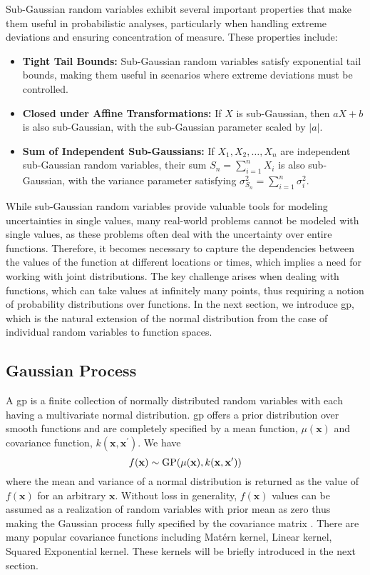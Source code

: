 Sub-Gaussian random variables exhibit several important properties that make them useful in probabilistic analyses, particularly when handling extreme deviations and ensuring concentration of measure. These properties include:  
\begin{itemize}
    \item \textbf{Tight Tail Bounds:} Sub-Gaussian random variables satisfy exponential tail bounds, making them useful in scenarios where extreme deviations must be controlled.  
    \item \textbf{Closed under Affine Transformations:} If \( X \) is sub-Gaussian, then \( aX + b \) is also sub-Gaussian, with the sub-Gaussian parameter scaled by \( \vert a \vert \).  
    \item \textbf{Sum of Independent Sub-Gaussians:} If \( X_1, X_2, \dots, X_n \) are independent sub-Gaussian random variables, their sum \( S_n = \sum_{i=1}^n X_i \) is also sub-Gaussian, with the variance parameter satisfying \( \sigma^2_{S_n} = \sum_{i=1}^n \sigma_i^2 \).  
\end{itemize} 

While sub-Gaussian random variables provide valuable tools for modeling uncertainties in single values, many real-world problems cannot be modeled with single values, as these problems often deal with the uncertainty over entire functions. Therefore, it becomes necessary to capture the dependencies between the values of the function at different locations or times, which implies a need for working with joint distributions. The key challenge arises when dealing with functions, which can take values at infinitely many points, thus requiring a notion of probability distributions over functions. In the next section,  we introduce \acf{gp}, which is the natural extension of the normal distribution from the case of individual random variables to function spaces.

\subsection{Gaussian Process}
\label{section:gaussian_process}
A \acf{gp} is a finite collection of normally distributed random variables with each having a multivariate normal distribution. \ac{gp} offers a prior distribution over smooth functions and are completely specified by a mean function, $\mu(\mathbf{x})$ and covariance function, $k(\mathbf{x}, \mathbf{x}^\prime)$. We have \begin{equation}
    \label{def:GP}
    f({\bf x})\sim\mathrm{GP}(\mu({\bf x}),k({\bf x},{\bf x}^\prime))
\end{equation}
where the mean and variance of a normal distribution is returned as the value of $f(\mathbf{x})$ for an arbitrary $\mathbf{x}$. Without loss in generality, $f(\mathbf{x})$ values can be assumed as a realization of random variables with prior mean as zero thus making the Gaussian process fully specified by the covariance matrix \citep{rasmussen2006gaussian}. There are many popular covariance functions including Mat\'ern kernel, Linear kernel, Squared Exponential kernel. These kernels will be briefly introduced in the next section.

